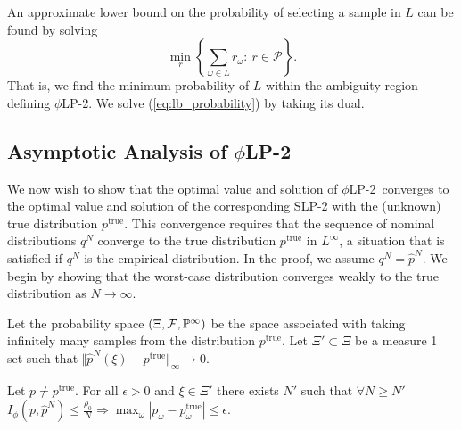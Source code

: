 \documentclass[ijoc,letterpaper]{informs3} %
\renewcommand{\P}{\mathbb{P}}
\newcommand{\ptrue}{p^{\text{true}}}
\newcommand{\plp}{$\phi$LP-2}
\begin{document}
An approximate lower bound on the probability of selecting a sample in $L$ can be found by solving
\begin{equation}
	\min_{r} \left\{ \sum_{\omega \in L} r_\omega \colon\ r \in \mathcal{P} \right\}. \label{eq:lb_probability}
\end{equation}
That is, we find the minimum probability of $L$ within the ambiguity region defining \plp.
We solve (\ref{eq:lb_probability}) by taking its dual.

\subsection{Asymptotic Analysis of \plp}
\label{ssec:epiconvergence}

We now wish to show that the optimal value and solution of \plp\ converges to the optimal value and solution of the corresponding SLP-2 with the (unknown) true distribution $\ptrue$.
This convergence requires that the sequence of nominal distributions $q^N$ converge to the true distribution $\ptrue$ in $L^\infty$, a situation that is satisfied if $q^N$ is the empirical distribution.
In the proof, we assume $q^N = \hat{p}^N$.
We begin by showing that the worst-case distribution converges weakly to the true distribution as $N \rightarrow \infty$.

Let the probability space $(\Xi,{\cal F},\P^\infty)$ be the space associated with taking infinitely many samples from the distribution $\ptrue$.
Let $\Xi' \subset \Xi$ be a measure 1 set such that $\Vert \hat{p}^N(\xi) - \ptrue \Vert_\infty \rightarrow 0$.

\begin{proposition} \label{prop:weak_conv}
	Let $p \neq \ptrue$.
	For all $\epsilon > 0$ and $\xi \in \Xi'$ there exists $N'$ such that $\forall N \geq N'$ $I_{\phi}(p,\hat{p}^N) \leq \frac{\rho_0}{N} \Rightarrow \max_\omega |p_\omega - \ptrue_\omega| \leq \epsilon$.
\end{proposition}
\end{document}
